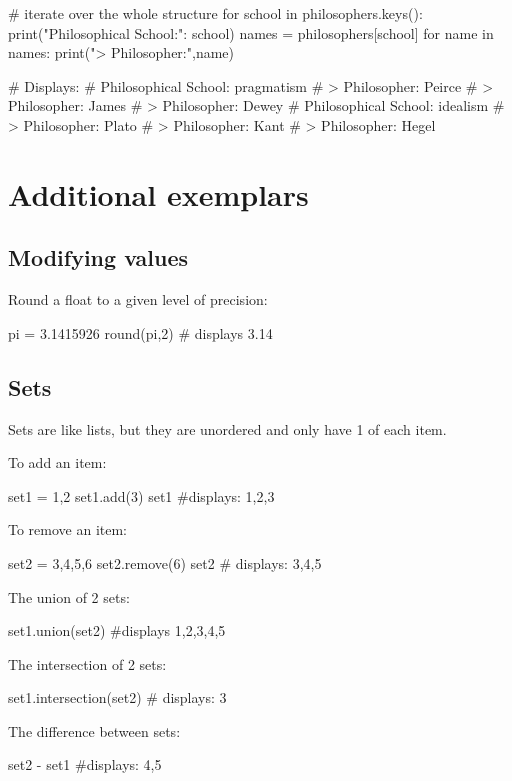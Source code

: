 \begin{pycode}
    # iterate over the whole structure
    for school in philosophers.keys():
    print("Philosophical School:": school)
    names = philosophers[school]
    for name in names:
    print("> Philosopher:",name)

    # Displays:
    # Philosophical School: pragmatism
    # > Philosopher: Peirce
    # > Philosopher: James
    # > Philosopher: Dewey
    # Philosophical School: idealism
    # > Philosopher: Plato
    # > Philosopher: Kant
    # > Philosopher: Hegel
\end{pycode}

\section{Additional exemplars}

\subsection{Modifying values}

Round a float to a given level of precision:

\begin{pycode}
    pi = 3.1415926
    round(pi,2) # displays 3.14
\end{pycode}

\subsection{Sets}

Sets are like lists, but they are unordered and only have 1 of each item.

To add an item:

\begin{pycode}
    set1 = {1,2}
    set1.add(3)
    set1 #displays: {1,2,3}
\end{pycode}

To remove an item:

\begin{pycode}
    set2 = {3,4,5,6}
    set2.remove(6)
    set2 # displays: {3,4,5}
\end{pycode}

The union of 2 sets:

\begin{pycode}
    set1.union(set2) #displays {1,2,3,4,5}
\end{pycode}

The intersection of 2 sets:

\begin{pycode}
    set1.intersection(set2) # displays: {3}
\end{pycode}

The difference between sets:

\begin{pycode}
    set2 - set1 #displays: {4,5}
\end{pycode}




